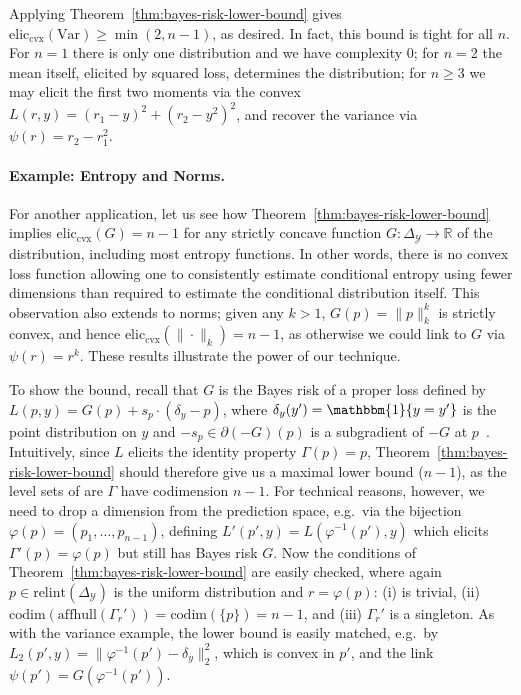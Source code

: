\documentclass{article}
\newcommand{\reals}{\mathbb{R}}
\newcommand{\simplex}{\Delta_\Y}
\newcommand{\relint}[1]{\mathrm{relint}(#1)}
\newcommand{\eliccvx}{\mathrm{elic}_\mathrm{cvx}}
\newcommand{\codim}{\mathrm{codim}}
\newcommand{\affhull}{\mathrm{affhull}}
\newcommand{\Y}{\mathcal{Y}}
\newcommand{\Var}{\mathrm{Var}}
\newcommand{\ones}{\mathbbm{1}}
\begin{document}
Applying Theorem~\ref{thm:bayes-risk-lower-bound} gives $\eliccvx(\Var) \geq \min(2,n-1)$, as desired.
In fact, this bound is tight for all $n$.
For $n=1$ there is only one distribution and we have complexity $0$; for $n=2$ the mean itself, elicited by squared loss, determines the distribution; for $n\geq 3$ we may elicit the first two moments via the convex $L(r,y) = (r_1-y)^2 + (r_2-y^2)^2$, and recover the variance via $\psi(r) = r_2-r_1^2$.

\paragraph{Example: Entropy and Norms.}
For another application, let us see how Theorem~\ref{thm:bayes-risk-lower-bound} implies $\eliccvx(G) = n-1$ for any strictly concave function $G:\simplex\to\reals$ of the distribution, including most entropy functions.
In other words, there is no convex loss function allowing one to consistently estimate conditional entropy using fewer dimensions than required to estimate the conditional distribution itself.
This observation also extends to norms; given any $k>1$, $G(p) = \|p\|_k^k$ is strictly convex, and hence $\eliccvx(\|\cdot\|_k) = n-1$, as otherwise we could link to $G$ via $\psi(r) = r^k$.
These results illustrate the power of our technique.

To show the bound, recall that $G$ is the Bayes risk of a proper loss defined by $L(p,y) = G(p) + s_p \cdot (\delta_y - p)$, where $\delta_y(y') = \ones\{y=y'\}$ is the point distribution on $y$ and $-s_p \in \partial (-G)(p)$ is a subgradient of $-G$ at $p$~\citep{gneiting2007strictly,reid2009surrogate,frongillo2014general}.
Intuitively, since $L$ elicits the identity property $\Gamma(p)=p$, Theorem~\ref{thm:bayes-risk-lower-bound} should therefore give us a maximal lower bound ($n-1$), as the level sets of are $\Gamma$ have codimension $n-1$.
For technical reasons, however, we need to drop a dimension from the prediction space, e.g.\ via the bijection $\varphi(p) = (p_1,\ldots,p_{n-1})$, defining $L'(p',y) = L(\varphi^{-1}(p'),y)$ which elicits $\Gamma'(p) = \varphi(p)$ but still has Bayes risk $G$.
Now the conditions of Theorem~\ref{thm:bayes-risk-lower-bound} are easily checked, where again $p\in\relint\simplex$ is the uniform distribution and $r=\varphi(p)$: (i) is trivial, (ii) $\codim(\affhull(\Gamma_r')) = \codim(\{p\}) = n-1$, and (iii) $\Gamma_r'$ is a singleton.
As with the variance example, the lower bound is easily matched, e.g.\ by $L_2(p',y) = \|\varphi^{-1}(p')-\delta_y\|_2^2$, which is convex in $p'$, and the link $\psi(p') = G(\varphi^{-1}(p'))$.
\end{document}
